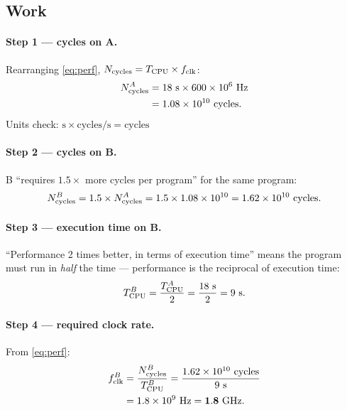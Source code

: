 \subsection*{Work}

\paragraph{Step 1 --- cycles on A.}
Rearranging \eqref{eq:perf}, $N_{\mathrm{cycles}} = T_{\mathrm{CPU}} \times f_{\mathrm{clk}}$:
\begin{align}
  N_{\mathrm{cycles}}^{A} &= 18\ \text{s} \times 600\times10^{6}\ \text{Hz} \\
              &= 1.08\times10^{10}\ \text{cycles.}
\end{align}
Units check: $\text{s} \times \text{cycles/s} = \text{cycles}$ \checkmark

\paragraph{Step 2 --- cycles on B.}
B ``requires $1.5\times$ more cycles per program'' for the same program:
\begin{equation}
  N_{\mathrm{cycles}}^{B} = 1.5 \times N_{\mathrm{cycles}}^{A}
              = 1.5 \times 1.08\times10^{10}
              = 1.62\times10^{10}\ \text{cycles.}
\end{equation}

\paragraph{Step 3 --- execution time on B.}
``Performance 2 times better, in terms of execution time'' means the program
must run in \emph{half} the time — performance is the reciprocal of execution
time:
\begin{equation}
  \CPUtime^{B} = \frac{\CPUtime^{A}}{2} = \frac{18\ \text{s}}{2} = 9\ \text{s.}
\end{equation}

\paragraph{Step 4 --- required clock rate.}
From \eqref{eq:perf}:
\begin{align}
  f_{\mathrm{clk}}^{B} &= \frac{N_{\mathrm{cycles}}^{B}}{T_{\mathrm{CPU}}^{B}}
                  = \frac{1.62\times10^{10}\ \text{cycles}}{9\ \text{s}} \\
                 &= 1.8\times10^{9}\ \text{Hz}
                  = \mathbf{1.8\ \text{GHz}.}
\end{align}

